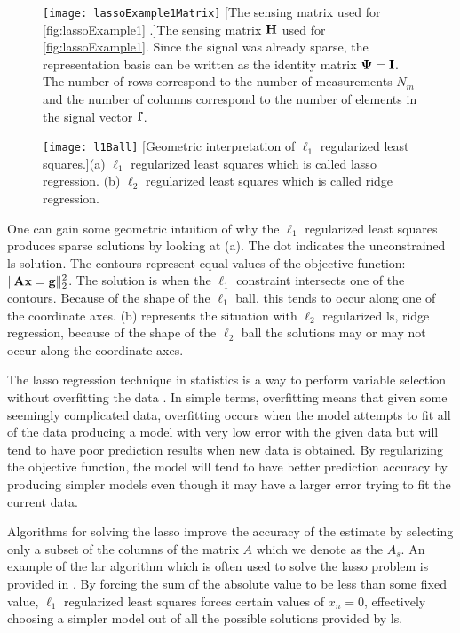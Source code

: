 \begin{figure}
	\centering
	\texttt{[image: lassoExample1Matrix]}
	[The sensing matrix used for \cref{fig:lassoExample1} .]{The sensing matrix $\displaystyle \mathbf{H}$ used for \cref{fig:lassoExample1}. Since the signal was already sparse, the representation basis can be written as the identity matrix $\displaystyle \mathbf{\Psi} = \displaystyle \mathbf{I}$. The number of rows correspond to the number of measurements $N_m$ and the number of columns correspond to the number of elements in the signal vector $\displaystyle \mathbf{f}$. }
	\label{fig:lassoExample1Matrix}
\end{figure}

%
\begin{figure}
	\texttt{[image: l1Ball]}
	[Geometric interpretation of $\ell_1$ regularized least squares.]{(a) $\ell_1$ regularized least squares which is called \gls{lasso} regression. (b) $\ell_2$ regularized least squares which is called ridge regression.}
	\label{fig:l1Ball}
\end{figure}

One can gain some geometric intuition of why the $\ell_1$ regularized least squares produces sparse solutions by looking at (a). The dot indicates the unconstrained \gls{ls} solution. The contours represent equal values of the objective function: $\| \displaystyle \mathbf{Ax} = \displaystyle \mathbf{g} \|_{2}^{2}$. The solution is when the $\ell_1$ constraint intersects one of the contours. Because of the shape of the $\ell_1$ ball, this tends to occur along one of the coordinate axes. (b) represents the situation with $\ell_2$ regularized \gls{ls}, ridge regression, because of the shape of the $\ell_2$ ball the solutions may or may not occur along the coordinate axes.

The \gls{lasso} regression technique in statistics is a way to perform variable selection without overfitting the data \cite{tibshirani1996regression, james2013introduction}. In simple terms, overfitting means that given some seemingly complicated data, overfitting occurs when the model attempts to fit all of the data producing a model with very low error with the given data but will tend to have poor prediction results when new data is obtained. By regularizing the objective function, the model will tend to have better prediction accuracy by producing simpler models even though it may have a larger error trying to fit the current data.

Algorithms for solving the \gls{lasso} improve the accuracy of the estimate by selecting only a subset of the columns of the matrix $A$ which we denote as the $A_s$. An example of the \gls{lar} algorithm which is often used to solve the \gls{lasso} problem is provided in \cite{efron2004least}. By forcing the sum of the absolute value to be less than some fixed value, $\ell_1$ regularized least squares forces certain values of $x_n = 0$, effectively choosing a simpler model out of all the possible solutions provided by \gls{ls}. 

